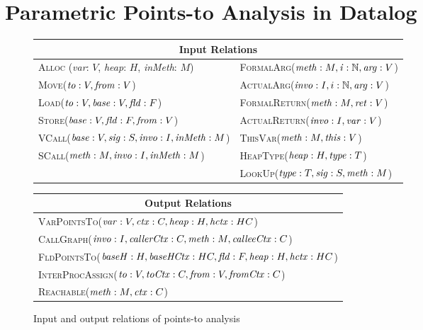\clearpage
\section{Parametric Points-to Analysis in Datalog}
\label{sec:analysisrules}
\label{sec:input-output-relations}
\begin{figure}[]
\begin{tabular}{ll} \hline
\multicolumn{2}{c}{Input Relations} \\
\hline
\textsc{Alloc} ({\it var}: $V$, {\it heap}: $H$, {\it inMeth}: $M$) &
\textsc{FormalArg}(${\it meth}:M,{\it i}:\mathbb{N},{\it arg}:V$) \\ 

\textsc{Move}(${\it to}:V,{\it from}:V$) 
	& \textsc{ActualArg}(${\it invo}:I,i:\mathbb{N},{\it arg}:V$)\\

\textsc{Load}(${\it to}:V,{\it base}:V,{\it fld}:F$) 
	& \textsc{FormalReturn}(${\it meth}:M,{\it ret}:V$) \\
\textsc{Store}(${\it base}:V,{\it fld}:F,{\it from}:V$) 
	& \textsc{ActualReturn}(${\it invo}:I,{\it var}:V$)\\
\textsc{VCall}(${\it base}:V,{\it sig}:S,{\it invo}:I,{\it inMeth}:M$)
	& \textsc{ThisVar}(${\it meth}:M,{\it this}:V$)\\ 
\textsc{SCall}(${\it meth}:M,{\it invo}:I,{\it inMeth}:M$) 
	& \textsc{HeapType}(${\it heap}:H,{\it type}:T$) \\
	& \textsc{LookUp}(${\it type}:T,{\it sig}:S,{\it meth}:M$)\\
\end{tabular}

\begin{tabular}{l}
\\
\hline
    \multicolumn{1}{c}{Output Relations} \\ \hline
    \textsc{VarPointsTo}(${\it var}:V,{\it ctx}:C,{\it heap}:H,{\it 
hctx}:HC$)\\
     \textsc{CallGraph}(${\it invo}:I,{\it callerCtx}:C,{\it
  meth}:M,{\it calleeCtx}:C$)\\
     \textsc{FldPointsTo}(${\it baseH}:H,{\it baseHCtx}:HC,{\it
  fld}:F,{\it heap}:H,{\it hctx}:HC$)\\
     \textsc{InterProcAssign}(${\it to}:V,{\it toCtx}:C,{\it
  from}:V,{\it fromCtx}:C$)\\
     \textsc{Reachable}(${\it meth}:M,{\it ctx}:C$)\\
\end{tabular}

\caption{Input and output relations of points-to analysis}
\label{fig:input-output}
\end{figure}
\clearpage


